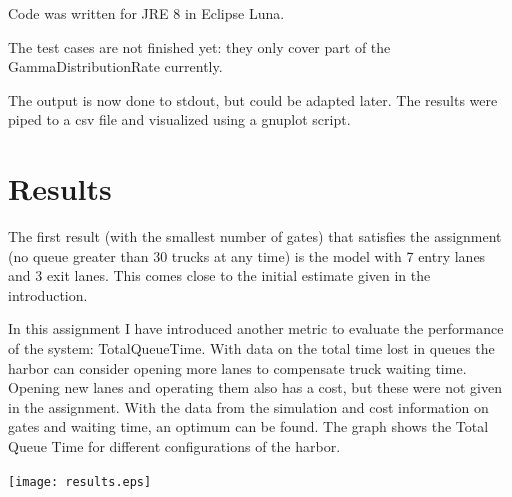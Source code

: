 \documentclass{article}
\begin{document}
Code was written for JRE 8 in Eclipse Luna.

The test cases are not finished yet: they only cover part of the
GammaDistributionRate currently.

The output is now done to stdout, but could be adapted later. The
results were piped to a csv file and visualized using a gnuplot
script.

\section{Results}

The first result (with the smallest number of gates) that satisfies
the assignment (no queue greater than 30 trucks at any time) is the
model with 7 entry lanes and 3 exit lanes. This comes close to the
initial estimate given in the introduction. 

In this assignment I have introduced another metric to evaluate the
performance of the system: TotalQueueTime. With data on the total time
lost in queues the harbor can consider opening more lanes to
compensate truck waiting time. Opening new lanes and operating them
also has a cost, but these were not given in the assignment. With the
data from the simulation and cost information on gates and waiting
time, an optimum can be found. The graph shows the Total Queue Time
for different configurations of the harbor.

\texttt{[image: results.eps]}
\end{document}
